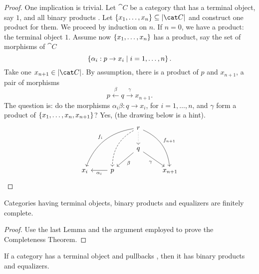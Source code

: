 \begin{proof}
One implication is trivial. Let \(\cat C\) be a category that has a terminal object, say \(1\), and all binary products . Let \(\set{x_1, \dots{}, x_n} \subseteq \obj{\cat C}\) and construct one product for them. We proceed by induction on \(n\). If \(n=0\), we have a product: the terminal object \(1\). Assume now \(\left\{x_1, \dots{}, x_n\right\}\) has a product, say the set of morphisms of \(\cat C\)
\[\left\{\alpha_i : p \to x_i \mid i = 1, \dots{}, n\right\} .\]
Take one \(x_{n+1} \in \obj{\cat C}\). By assumption, there is a product of \(p\) and \(x_{n+1}\), a pair of morphisms
\[p \xleftarrow \beta q \xrightarrow \gamma x_{n+1} .\]
The question is: do the morphisms \(\alpha_i \beta : q \to x_i\), for \(i = 1, \dots{}, n\), and \(\gamma\) form a product of \(\left\{x_1, \dots{}, x_n, x_{n+1}\right\}\)? Yes,  (the drawing below is a hint).
\[\begin{tikzcd}
& & r \ar["{f_i}", ddll, swap, bend right] \ar["{f_{n+1}}", ddr, bend left] 
\ar[ddl, bend right, dashed] \ar[d, dotted] \\
& & q \ar["\beta", dl] \ar["\gamma", dr, swap] \\
x_i & p \ar["{\alpha_i}", l] & & x_{n+1} 
\end{tikzcd}\qedhere\]
\end{proof}

\begin{proposition}
Categories having terminal objects, binary products and equalizers are finitely complete. 
\end{proposition}

\begin{proof}
Use the last Lemma and the argument employed to prove the Completeness Theorem.
\end{proof}

\begin{lemma}
If a category has a terminal object and pullbacks , then it has binary products and equalizers.
\end{lemma}

